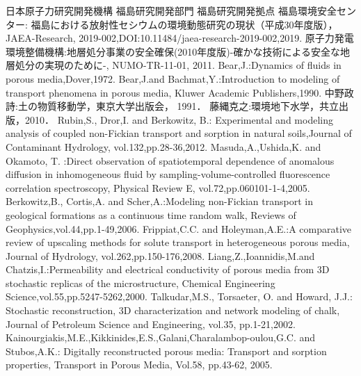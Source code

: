 \documentclass{jsce}
\begin{document}
\begin{thebibliography}{99}
\begin{spacing}{1.175}
	日本原子力研究開発機構 福島研究開発部門 福島研究開発拠点 福島環境安全センター:  
	福島における放射性セシウムの環境動態研究の現状（平成30年度版），JAEA-Research,
	2019-002,DOI:10.11484/jaea-research-2019-002,2019.
	原子力発電環境整備機構:地層処分事業の安全確保(2010年度版)-確かな技術による安全な地層処分の実現のために-, NUMO-TR-11-01, 2011.
	Bear,J.:Dynamics of fluids in porous media,Dover,1972.
	Bear,J.and Bachmat,Y.:Introduction to modeling of transport phenomena in porous media, Kluwer Academic Publishers,1990.
	中野政詩:土の物質移動学，東京大学出版会， 1991．
	藤縄克之:環境地下水学，共立出版，2010．
	Rubin,S., Dror,I. and Berkowitz, B.: Experimental and 
		modeling analysis of coupled non-Fickian transport and 
		sorption in natural soils,Journal of Contaminant Hydrology, vol.132,pp.28-36,2012.
\newpage
{}
	Masuda,A.,Ushida,K. and Okamoto, T. :Direct observation of spatiotemporal dependence of anomalous diffusion in 
		inhomogeneous 
		fluid by sampling-volume-controlled fluorescence correlation spectroscopy, Physical Review E, vol.72,pp.060101-1-4,2005.
	Berkowitz,B., Cortis,A. and Scher,A.:Modeling non-Fickian transport in geological formations as a continuous time random walk, Reviews of Geophysics,vol.44,pp.1-49,2006.
	Frippiat,C.C. and Holeyman,A.E.:A comparative review of upscaling methods for solute transport in heterogeneous porous media, Journal of Hydrology, vol.262,pp.150-176,2008.
	Liang,Z.,Ioannidis,M.and Chatzis,I.:Permeability and electrical conductivity of porous media from 3D stochastic replicas of the microstructure, Chemical Engineering Science,vol.55,pp.5247-5262,2000. 
	Talkudar,M.S., Torsaeter, O. and Howard, J.J.:
	Stochastic reconstruction, 3D characterization and network modeling of chalk, Journal of Petroleum Science and Engineering, 
	vol.35, pp.1-21,2002.
	Kainourgiakis,M.E.,Kikkinides,E.S.,Galani,Charalambop-oulou,G.C. and Stubos,A.K.:
	Digitally reconstructed porous media: Transport and sorption properties,
	Transport in Porous Media, Vol.58, pp.43-62, 2005.

\end{spacing}
\end{thebibliography}
\end{document}
